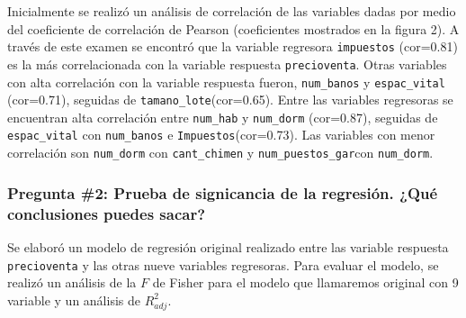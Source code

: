 \documentclass[
]{article}
\begin{document}
Inicialmente se realizó un análisis de correlación de las variables
dadas por medio del coeficiente de correlación de Pearson (coeficientes
mostrados en la figura 2). A través de este examen se encontró que la
variable regresora \texttt{impuestos} (cor=0.81) es la más
correlacionada con la variable respuesta \texttt{precioventa}. Otras
variables con alta correlación con la variable respuesta fueron,
\texttt{num\_banos} y \texttt{espac\_vital} (cor=0.71), seguidas de
\texttt{tamano\_lote}(cor=0.65). Entre las variables regresoras se
encuentran alta correlación entre \texttt{num\_hab} y \texttt{num\_dorm}
(cor=0.87), seguidas de \texttt{espac\_vital} con \texttt{num\_banos} e
\texttt{Impuestos}(cor=0.73). Las variables con menor correlación son
\texttt{num\_dorm} con \texttt{cant\_chimen} y
\texttt{num\_puestos\_gar}con \texttt{num\_dorm}.

\hypertarget{pregunta-2-prueba-de-signicancia-de-la-regresiuxf3n.-quuxe9-conclusiones-puedes-sacar}{%
\subsubsection{Pregunta \#2: Prueba de signicancia de la regresión. ¿Qué
conclusiones puedes
sacar?}\label{pregunta-2-prueba-de-signicancia-de-la-regresiuxf3n.-quuxe9-conclusiones-puedes-sacar}}

Se elaboró un modelo de regresión original realizado entre las variable
respuesta \texttt{precioventa} y las otras nueve variables regresoras.
Para evaluar el modelo, se realizó un análisis de la \(F\) de Fisher
para el modelo que llamaremos original con 9 variable y un análisis de
\(R_{adj}^2\).
\end{document}

